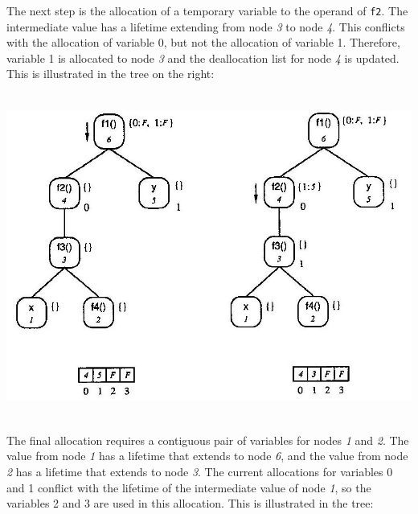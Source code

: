 The next step is the allocation of a temporary variable to the operand
of \texttt{f2}. The intermediate value has a lifetime extending from node
\textit{3} to node \textit{4}. This conflicts with the allocation of
variable 0, but not the allocation of variable 1. Therefore, variable
1 is allocated to node \textit{3} and the deallocation list for node
\textit{4} is updated. This is illustrated in the tree on the right:

{\centering{}
\includegraphics[width=6.0in,height=4.2in]{kw/figure8-3.png}
\par}

The final allocation requires a contiguous pair of variables for nodes
\textit{1} and \textit{2}. The value from node \textit{1} has a
lifetime that extends to node \textit{6}, and the value from node
\textit{2} has a lifetime that extends to node \textit{3}. The current
allocations for variables 0 and 1 conflict with the lifetime of the
intermediate value of node \textit{1}, so the variables 2 and 3 are
used in this allocation. This is illustrated in the tree:

